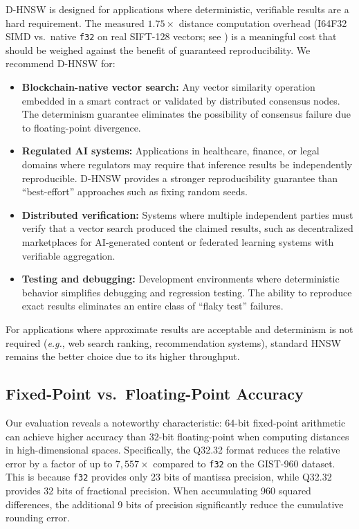 \documentclass[10pt,journal]{IEEEtran}
\newcommand{\dhnsw}{\textsc{D-HNSW}}
\newcommand{\hnsw}{\textsc{HNSW}}
\newcommand{\eg}{\textit{e.g.}}
\begin{document}
\dhnsw{} is designed for applications where deterministic, verifiable results are a hard requirement. The measured $1.75\times$ distance computation overhead (I64F32 SIMD vs.\ native \texttt{f32} on real SIFT-128 vectors; see ) is a meaningful cost that should be weighed against the benefit of guaranteed reproducibility. We recommend \dhnsw{} for:

\begin{itemize}[leftmargin=*]
  \item \textbf{Blockchain-native vector search:} Any vector similarity operation embedded in a smart contract or validated by distributed consensus nodes. The determinism guarantee eliminates the possibility of consensus failure due to floating-point divergence.

  \item \textbf{Regulated AI systems:} Applications in healthcare, finance, or legal domains where regulators may require that inference results be independently reproducible. \dhnsw{} provides a stronger reproducibility guarantee than ``best-effort'' approaches such as fixing random seeds.

  \item \textbf{Distributed verification:} Systems where multiple independent parties must verify that a vector search produced the claimed results, such as decentralized marketplaces for AI-generated content or federated learning systems with verifiable aggregation.

  \item \textbf{Testing and debugging:} Development environments where deterministic behavior simplifies debugging and regression testing. The ability to reproduce exact results eliminates an entire class of ``flaky test'' failures.
\end{itemize}

For applications where approximate results are acceptable and determinism is not required (\eg, web search ranking, recommendation systems), standard \hnsw{} remains the better choice due to its higher throughput.

\subsection{Fixed-Point vs.\ Floating-Point Accuracy}

Our evaluation reveals a noteworthy characteristic: 64-bit fixed-point arithmetic can achieve higher accuracy than 32-bit floating-point when computing distances in high-dimensional spaces. Specifically, the Q32.32 format reduces the relative error by a factor of up to $7{,}557\times$ compared to \texttt{f32} on the GIST-960 dataset. This is because \texttt{f32} provides only 23 bits of mantissa precision, while Q32.32 provides 32 bits of fractional precision. When accumulating 960 squared differences, the additional 9 bits of precision significantly reduce the cumulative rounding error.
\end{document}
